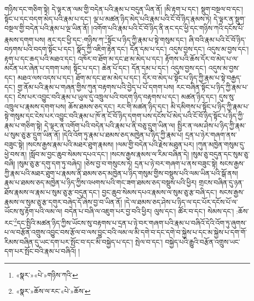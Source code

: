 གཉིས་དང་གཅིག་སྟེ། དེ་ལྟར་ན་ལམ་གྱི་བདེན་པའི་རྣམ་པ་བདུན་ཡིན་ནོ། །མི་རྟག་པ་དང་། སྡུག་བསྔལ་བ་དང་། སྟོང་པ་དང་བདག་མེད་པའི་རྣམ་པ་དང་། ལྔ་པ་མཚན་ཉིད་མེད་པའི་རྣམ་པའི་ངོ་བོ་ཉིད་རྣམས་ཏེ། དེ་ལྟར་ན་སྡུག་བསྔལ་གྱི་བདེན་པའི་རྣམ་པ་ལྔ་ཡིན་ནོ། །འགོག་པའི་རྣམ་པའི་ངོ་བོ་ཉིད་ནི་ནང་དང་ཕྱི་དང་གཉིས་ཀའི་དངོས་པོ་རྣམས་དགག་པས། ནང་དང་ཕྱི་དང་:གཉིས་ཀ་\footnote{«སྣར་»«པེ་»གཉིས་ཀའི་}སྟོང་པ་ཉིད་ཀྱི་རྣམ་པ་སྟེ་གསུམ་དང་། ཞི་བའི་རྣམ་པའི་ངོ་བོ་ཉིད་བཏགས་པའི་བདག་སྟོང་པ་དང་། སྣོད་ཀྱི་འཇིག་རྟེན་དང་། དོན་དམ་པ་དང་། འདུས་བྱས་དང་། འདུས་མ་བྱས་དང་། རྟག་པ་དང་ཆད་པའི་མཐའ་དང་། འཁོར་བ་ཐོག་མ་དང་ཐ་མ་མེད་པ་དང་། རྟོགས་པའི་ཆོས་དོར་བ་མེད་པ་ལ་མངོན་པར་ཞེན་པ་དགག་པས། སྟོང་པ་དང་། ཆེན་པོ་དང་། དོན་དམ་པ་དང་། འདུས་བྱས་དང་། འདུས་མ་བྱས་དང་། མཐའ་ལས་འདས་པ་དང་། ཐོག་མ་དང་ཐ་མ་མེད་པ་དང་། དོར་བ་མེད་པ་སྟོང་པ་ཉིད་ཀྱི་རྣམ་པ་སྟེ་བརྒྱད་དང་། གྱ་ནོམ་པའི་རྣམ་པ་གཞན་གྱིས་ཀུན་བརྟགས་པའི་བྱེད་པ་པོ་དགག་པས། རང་བཞིན་སྟོང་པ་ཉིད་ཀྱི་རྣམ་པ་དང་། ངེས་པར་འབྱུང་བའི་རྣམ་པ་ཡུལ་དུ་འཁྲུལ་པའི་བདག་ཉིད་བརྟགས་པ་དང་། མཚན་ཉིད་དང་། དུས་སུ་འཁྲུལ་པ་རྣམས་དགག་པས། ཆོས་ཐམས་ཅད་དང་། རང་གི་མཚན་ཉིད་དང་། མི་དམིགས་པ་སྟོང་པ་ཉིད་ཀྱི་རྣམ་པ་སྟེ་གསུམ་དང་ངེས་པར་འབྱུང་བའི་རྣམ་པ་ཁོ་ན་ངོ་བོ་ཉིད་དགག་པས་དངོས་པོ་མེད་པའི་ངོ་བོ་ཉིད་སྟོང་པ་ཉིད་ཀྱི་རྣམ་པ་གཅིག་སྟེ། དེ་ལྟར་ན་འགོག་པའི་བདེན་པའི་རྣམ་པ་ནི་བཅུ་དྲུག་ཡིན་ལ། སྤྱིར་ན་ལམ་ཤེས་པ་ཉིད་ཀྱི་རྣམ་པ་སུམ་ཅུ་རྩ་དྲུག་ཡིན་ནོ། །དེའི་འོག་ཏུ་རྣམ་པ་ཐམས་ཅད་མཁྱེན་པ་ཉིད་ཀྱི་རྣམ་པ། དྲན་པ་ཉེར་གཞག་ནས་བཟུང་སྟེ། །སངས་རྒྱས་རྣམ་པའི་མཐར་ཐུག་རྣམས། །ལམ་གྱི་བདེན་པའི་རྗེས་མཐུན་པར། །ཀུན་མཁྱེན་གསུམ་དུ་ཕྱེ་བས་ན། །སློབ་མ་བྱང་ཆུབ་སེམས་དཔའ་དང་། །སངས་རྒྱས་རྣམས་ལ་རིམ་བཞིན་དེ། །སུམ་ཅུ་བདུན་དང་སུམ་ཅུ་བཞི། །སུམ་ཅུ་རྩ་དགུ་དག་ཏུ་བཞེད། །ཅེས་བྱ་བ་གསུངས་ཏེ། དྲན་པ་ཉེ་བར་གཞག་པ་ནས་བཟུང་སྟེ། སངས་རྒྱས་ཀྱི་རྣམ་པའི་མཐར་ཐུག་པ་རྣམས་ནི་ཐམས་ཅད་མཁྱེན་པ་ཉིད་གསུམ་གྱིས་བསྡུས་པའི་ལམ་ཡིན་པའི་སྒོ་ནས། རྣམ་པ་ཐམས་ཅད་མཁྱེན་པ་ཉིད་ཀྱིས་འཕགས་པའི་གང་ཟག་ཐམས་ཅད་བསྡུས་པའི་ཕྱིར། གྲངས་བཞིན་དུ་ཉན་ཐོས་རྣམས་ལ་རྣམ་པ་སུམ་ཅུ་རྩ་བདུན་དང་། བྱང་ཆུབ་སེམས་དཔའ་རྣམས་ལ་སུམ་ཅུ་རྩ་བཞི་དང་། སངས་རྒྱས་རྣམས་ལ་སུམ་ཅུ་རྩ་དགུར་བཞེད་དོ་ཞེས་བྱ་བ་ཡིན་ནོ། །དེ་ལ་ཐམས་ཅད་ཤེས་པ་ཉིད་ལ་དང་པོར་དངོས་པོ་ལ་ཡོངས་སུ་རྟོག་པའི་ལམ་ལ། བདེན་པ་བཞི་ལ་འཇུག་པར་བྱ་བའི་ཕྱིར། ལུས་དང་། ཚོར་བ་དང་། སེམས་དང་། :ཆོས་རང་\footnote{«སྣར་»ཆོས་ལ་རང་«པེ་»ཆོས་}དང་སྤྱིའི་མཚན་ཉིད་ཀྱིས་ཡོངས་སུ་བརྟགས་པ་དྲན་པ་ཉེ་བར་གཞག་པའི་རྣམ་པ་བཞིའོ་དེའི་འོག་ཏུ་ཞུགས་པ་ལ་བརྩོན་འགྲུས་འབྱུང་བས་རྩོལ་བ་ལས་བྱུང་བའི་ལམ་ལ་མི་དགེ་བ་དང་དགེ་བ་སྐྱེས་པ་དང་མ་སྐྱེས་པ་དག་གོ་རིམས་བཞིན་དུ་ཡང་དག་པར་སྤོང་བ་དང་མི་བསྐྱེད་པ་དང་། སྤེལ་བ་དང་། བསྐྱེད་པའི་རྒྱུའི་བརྩོན་འགྲུས་ཡང་དག་པར་སྤོང་བའི་རྣམ་པ་བཞིའོ། །
